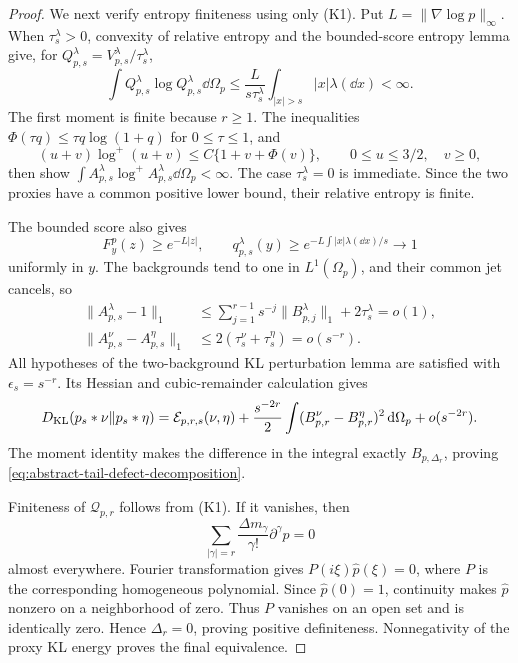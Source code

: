 \begin{proof}
We next verify entropy finiteness using only \textup{(K1)}.  Put
\(L=\|\nabla\log p\|_\infty\).  When \(\tau_s^\lambda>0\), convexity of
relative entropy and the bounded-score entropy lemma give, for
\(Q_{p,s}^\lambda=V_{p,s}^\lambda/\tau_s^\lambda\),
\begin{equation}\label{eq:abstract-tail-normalized-proxy-entropy}
 \int Q_{p,s}^\lambda\log Q_{p,s}^\lambda\dd\Omega_p
 \le\frac{L}{s\tau_s^\lambda}
 \int_{|x|>s}|x|\lambda(\dd x)<\infty.
\end{equation}
The first moment is finite because \(r\ge1\).  The inequalities
\(\Phi(\tau q)\le\tau q\log(1+q)\) for \(0\le\tau\le1\), and
\[
 (u+v)\log^+(u+v)\le C\{1+v+\Phi(v)\},
 \qquad 0\le u\le3/2,\quad v\ge0,
\]
then show
\(\int A_{p,s}^\lambda\log^+A_{p,s}^\lambda\dd\Omega_p<\infty\).
The case \(\tau_s^\lambda=0\) is immediate.  Since the two proxies have a
common positive lower bound, their relative entropy is finite.

The bounded score also gives
\[
 F_y^p(z)\ge e^{-L|z|},\qquad
 q_{p,s}^\lambda(y)
 \ge e^{-L\int|x|\lambda(\dd x)/s}\longrightarrow1
\]
uniformly in \(y\).  The backgrounds tend to one in \(L^1(\Omega_p)\), and
their common jet cancels, so
\begin{align*}
 \|A_{p,s}^\lambda-1\|_1
 &\le\sum_{j=1}^{r-1}s^{-j}\|B_{p,j}^\lambda\|_1
      +2\tau_s^\lambda=o(1),\\
 \|A_{p,s}^\nu-A_{p,s}^\eta\|_1
 &\le2(\tau_s^\nu+\tau_s^\eta)=o(s^{-r}).
\end{align*}
All hypotheses of the two-background KL perturbation lemma are satisfied
with \(\epsilon_s=s^{-r}\).  Its Hessian and cubic-remainder calculation
gives
\[
 D_{\rm KL}(p_s*\nu\|p_s*\eta)
 =\mathcal E_{p,r,s}(\nu,\eta)
  +\frac{s^{-2r}}2\int
       (B_{p,r}^\nu-B_{p,r}^\eta)^2\,\mathrm{d}\Omega_p+o(s^{-2r}).
\]
The moment identity makes the difference in the integral exactly
\(B_{p,\Delta_r}\), proving \eqref{eq:abstract-tail-defect-decomposition}.

Finiteness of \(\mathcal Q_{p,r}\) follows from \textup{(K1)}.  If it
vanishes, then
\[
 \sum_{|\gamma|=r}\frac{\Delta m_\gamma}{\gamma!}
 \partial^\gamma p=0
\]
almost everywhere.  Fourier transformation gives
\(P(i\xi)\widehat p(\xi)=0\), where \(P\) is the corresponding homogeneous
polynomial.  Since \(\widehat p(0)=1\), continuity makes \(\widehat p\)
nonzero on a neighborhood of zero.  Thus \(P\) vanishes on an open set and
is identically zero.  Hence \(\Delta_r=0\), proving positive definiteness.
Nonnegativity of the proxy KL energy proves the final equivalence.
\end{proof}

